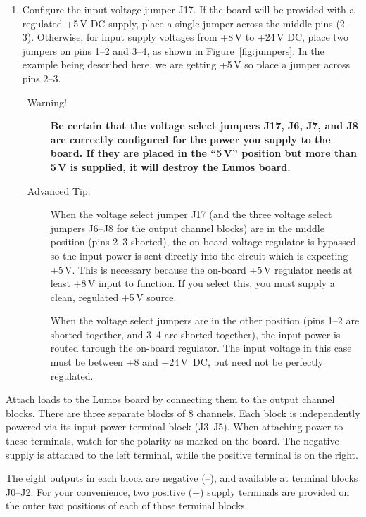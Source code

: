 \documentclass[letterpaper,twoside,onecolumn,openright,final]{memoir}
\begin{document}
\begin{enumerate}
	\item\label{s:pwrjump}
		Configure the input voltage jumper J17.  If the board will be provided with a regulated
		+5\,V DC supply, place a single jumper across the middle pins (2--3).  Otherwise, for input 
		supply voltages from +8\,V to +24\,V DC, place two jumpers on pins 1--2 and 3--4,
		as shown in Figure~\ref{fig:jumpers}.  In the example being described here, we are
		getting +5\,V so place a jumper across pins 2--3.
		\begin{description}
			\item[\HandRight\ Warning!]
				{\bfseries Be certain that the voltage select jumpers J17, J6, J7, and
				J8 are correctly configured for the power you supply to the board.  If
				they are placed in the ``5\,V'' position but more than 5\,V is 
				supplied, it will destroy the Lumos board.}
			\item[\HandRight\ Advanced Tip:] 
				When the voltage select jumper J17 (and the three voltage select
				jumpers J6--J8 for the output channel blocks) are in the middle position
				(pins 2--3 shorted), the on-board voltage regulator is bypassed so the
				input power is sent directly into the circuit which is expecting +5\,V.
				This is necessary because the on-board +5\,V regulator needs at least
				+8\,V input to function.  If you select this, you must supply a clean,
				regulated +5\,V source.

				When the voltage select jumpers are in the other position (pins 1--2 are
				shorted together, and 3--4 are shorted together), the input power is routed
				through the on-board regulator.  The input voltage in this case must be
				between +8 and +24\,V~DC, but need not be perfectly regulated.
		\end{description}
\end{enumerate}

Attach loads to the Lumos board by connecting them to the output channel blocks.  There are three separate
blocks of 8 channels.  Each block is independently powered via its input power terminal block (J3--J5).
When attaching power to these terminals, watch for the polarity as marked on the board.  The negative supply
is attached to the left terminal, while the positive terminal is on the right.

The eight outputs in each block are negative (--), and available at terminal blocks J0--J2.  
For your convenience, two positive (+) supply terminals
are provided on the outer two positions of each of those terminal blocks.
\end{document}
